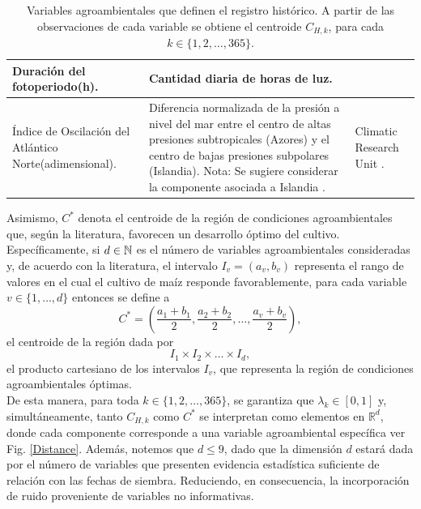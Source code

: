 \begin{table}
\begin{tabular}{p{4.4cm}|p{6.8cm}|p{4.2cm}}
		Duración del fotoperiodo\newline (h). 
		& Cantidad diaria de horas de luz. 
		&\\
		
		\hline
		
		Índice de Oscilación del Atlántico Norte\newline (adimensional). 
		& Diferencia normalizada de la presión a nivel del mar entre el centro de altas presiones subtropicales (Azores) y el centro de bajas presiones subpolares (Islandia). \newline
		Nota: Se sugiere considerar la componente asociada a Islandia \cite{Riaz_2017}. 
		&  Climatic Research Unit \cite{Jones_1997}. \\
		
		\hline
	\end{tabular}
	\caption{Variables agroambientales que definen el registro histórico. A partir de las observaciones de cada variable se obtiene el centroide $C_{H,k}$, para cada $k \in \{1,2,\ldots,365\}$.}
	\label{AgroVariables}
\end{table}

 Asimismo, $C^*$ denota el centroide de la región de condiciones agroambientales que, según la literatura, favorecen un desarrollo óptimo del cultivo. Específicamente, si $d\in \mathbb{N}$ es el número de variables agroambientales consideradas y, de acuerdo con la literatura, el intervalo $I_v = (a_v, b_v)$ representa el rango de valores en el cual el cultivo de maíz responde favorablemente, para cada variable $v \in \{1, \dots, d\}$ entonces se define a \begin{equation}
 	C^*= \left(\frac{a_1+b_1}{2}, \frac{a_2+b_2}{2}, \ldots, \frac{a_v+b_v}{2} \right),
 \end{equation}el centroide de la región dada por \begin{equation*}
 I_1 \times I_2 \times \ldots \times I_d,
 \end{equation*}el producto cartesiano de los intervalos $I_v$, que representa la región de condiciones agroambientales óptimas.\\ 
 
 De esta manera, para toda $k\in \{1,2,\ldots, 365\}$, se garantiza que $\lambda_k \in [0,1]$ y, simultáneamente, tanto $C_{H,k}$ como $C^*$ se interpretan como elementos en $\mathbb{R}^d$, donde cada componente corresponde a una variable agroambiental específica ver Fig. \ref{Distance}. Además, notemos que $d \leq 9$, dado que la dimensión $d$ estará dada por el número de variables que presenten evidencia estadística suficiente de relación con las fechas de siembra. Reduciendo, en consecuencia, la incorporación de ruido proveniente de variables no informativas.\\

